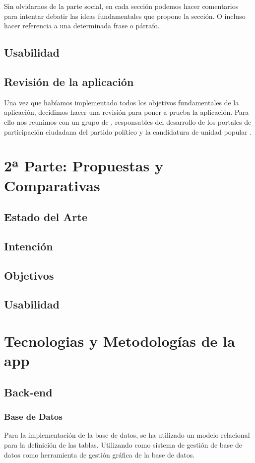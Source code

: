 Sin olvidarnos de la parte social, en cada sección podemos hacer comentarios para intentar debatir las ideas fundamentales que propone la sección. O incluso hacer referencia a una determinada frase o párrafo.
	\subsection{Usabilidad}
	
	\subsection{Revisión de la aplicación}
Una vez que habíamos implementado todos los objetivos fundamentales de la aplicación, decidimos hacer una revisión para poner a prueba la aplicación. Para ello nos reunimos con un grupo de \cite{ref:labodemo}, responsables del desarrollo de los portales de participación ciudadana del partido político \cite{ref:podemos} y la candidatura de unidad popular \cite{ref:ahoramadrid}.
  
\section{2ª Parte: Propuestas y Comparativas}
  \subsection{Estado del Arte}

  \subsection{Intención}
  \subsection{Objetivos}
  \subsection{Usabilidad}
  
  
\section{Tecnologias y Metodologías de la app}

	\subsection{Back-end}

  		\subsubsection{Base de Datos}\label{sssec:database}
Para la implementación de la base de datos, se ha utilizado un modelo relacional para la definición de las tablas. Utilizando \cite{ref:MySQL} como sistema de gestión de base de datos \cite{ref:phpMyAdmin} como herramienta de gestión gráfica de la base de datos.

